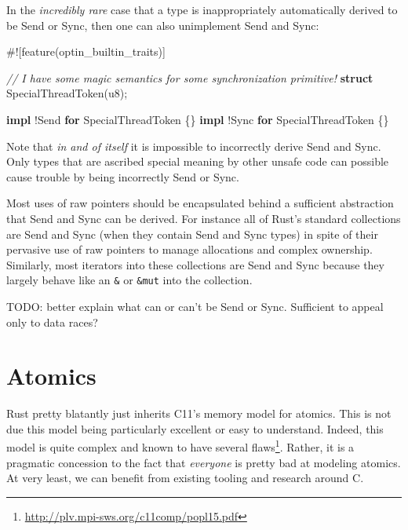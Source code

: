 \documentclass[a4paper,]{book}
\newenvironment{Shaded}{\begin{snugshade}}{\end{snugshade}}
\newcommand{\KeywordTok}[1]{\textcolor[rgb]{0.13,0.29,0.53}{\textbf{{#1}}}}
\newcommand{\DataTypeTok}[1]{\textcolor[rgb]{0.13,0.29,0.53}{{#1}}}
\newcommand{\CommentTok}[1]{\textcolor[rgb]{0.56,0.35,0.01}{\textit{{#1}}}}
\newcommand{\BuiltInTok}[1]{{#1}}
\newcommand{\AttributeTok}[1]{\textcolor[rgb]{0.77,0.63,0.00}{{#1}}}
\newcommand{\NormalTok}[1]{{#1}}
\renewcommand{\href}[2]{#2\footnote{\url{#1}}}
\begin{document}
In the \emph{incredibly rare} case that a type is inappropriately
automatically derived to be Send or Sync, then one can also unimplement
Send and Sync:

\begin{Shaded}
\begin{Highlighting}[]
\AttributeTok{#![}\NormalTok{feature}\AttributeTok{(}\NormalTok{optin_builtin_traits}\AttributeTok{)]}

\CommentTok{// I have some magic semantics for some synchronization primitive!}
\KeywordTok{struct} \NormalTok{SpecialThreadToken(}\DataTypeTok{u8}\NormalTok{);}

\KeywordTok{impl} \NormalTok{!}\BuiltInTok{Send} \KeywordTok{for} \NormalTok{SpecialThreadToken \{\}}
\KeywordTok{impl} \NormalTok{!}\BuiltInTok{Sync} \KeywordTok{for} \NormalTok{SpecialThreadToken \{\}}
\end{Highlighting}
\end{Shaded}

Note that \emph{in and of itself} it is impossible to incorrectly derive
Send and Sync. Only types that are ascribed special meaning by other
unsafe code can possible cause trouble by being incorrectly Send or
Sync.

Most uses of raw pointers should be encapsulated behind a sufficient
abstraction that Send and Sync can be derived. For instance all of
Rust's standard collections are Send and Sync (when they contain Send
and Sync types) in spite of their pervasive use of raw pointers to
manage allocations and complex ownership. Similarly, most iterators into
these collections are Send and Sync because they largely behave like an
\texttt{\&} or \texttt{\&mut} into the collection.

TODO: better explain what can or can't be Send or Sync. Sufficient to
appeal only to data races?

\section{Atomics}\label{sec--atomics}

Rust pretty blatantly just inherits C11's memory model for atomics. This
is not due this model being particularly excellent or easy to
understand. Indeed, this model is quite complex and known to have
\href{http://plv.mpi-sws.org/c11comp/popl15.pdf}{several flaws}. Rather,
it is a pragmatic concession to the fact that \emph{everyone} is pretty
bad at modeling atomics. At very least, we can benefit from existing
tooling and research around C.
\end{document}
